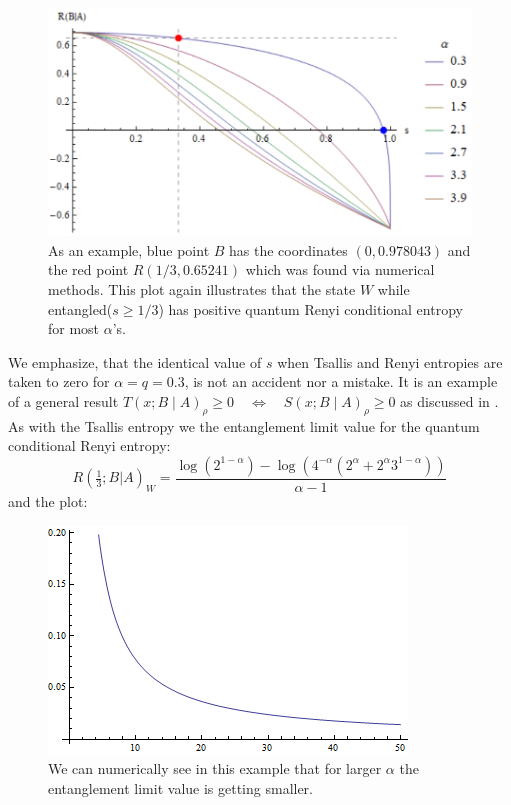 \begin{figure}[H]
\label{figure2}
\begin{center}
\includegraphics[scale=0.8]{figures/conditional_renyi_werner.png}
\caption{As an example, blue point $B$ has the coordinates $(0,0.978043)$ and the red point $R(1/3,0.65241)$ which was found via numerical methods. This plot again illustrates that the state $W$ while entangled($s\geq 1/3 $) has positive quantum Renyi conditional entropy for most $\alpha$'s.}
\end{center}
\end{figure}
We emphasize, that the identical value of $s$ when Tsallis and Renyi entropies are taken to zero for $\alpha=q=0.3$, is not an accident nor a mistake. It is an example of a general result $T(x ; B \mid A)_{\rho} \geq 0 \quad \Leftrightarrow \quad S(x; B \mid A)_{\rho} \geq 0$ as discussed in \cite{vollbrecht2002conditional}. As with the Tsallis entropy we the entanglement limit value for the quantum conditional Renyi entropy:
\begin{equation}
R(\tfrac{1}{3};B|A)_W=
\frac{\log \left(2^{1-\alpha }\right)-\log \left(4^{-\alpha } \left(2^{\alpha }+2^{\alpha } 3^{1-\alpha }\right)\right)}{\alpha -1}
\end{equation}
and the plot:
\begin{figure}[H]
\begin{center}
\includegraphics[scale=0.8]{figures/diag2.png}
\caption{We can numerically see in this example that for larger $\alpha$ the entanglement limit value is getting smaller.}
\label{figr3}
\end{center}
\end{figure}
